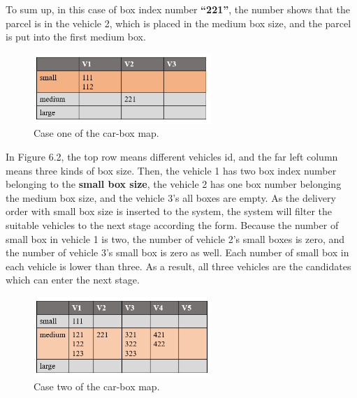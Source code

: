 \documentclass[12pt]{ksthesis}
\begin{document}
\begin{thesis}
{\begin{itemize}
\end{itemize}

To sum up, in this case of box index number \textbf{“221”}, the number shows that the parcel is in the vehicle 2, which is placed in the medium box size, and the parcel is put into the first medium box.

\begin{figure}[H]
\centering
\includegraphics[width=0.6\textwidth]{./Thesis_figures/F6-2_caseOne_boxFiltering.PNG}
\caption{\large Case one of the car-box map.}
\vspace{0.5cm}
\label{Fig:CaseOne_carBox_Map}
\end{figure}

In Figure 6.2, the top row means different vehicles id, and the far left column means three kinds of box size. Then, the vehicle 1 has two box index number belonging to the \textbf{small box size}, the vehicle 2 has one box number belonging the medium box size, and the vehicle 3’s all boxes are empty.
As the delivery order with small box size is inserted to the system, the system will filter the suitable vehicles to the next stage according the form. Because the number of small box in vehicle 1 is two, the number of vehicle 2’s small boxes is zero, and the number of vehicle 3’s small box is zero as well. Each number of small box in each vehicle is lower than three. As a result, all three vehicles are the candidates which can enter the next stage.

\begin{figure}[t]
\centering
\includegraphics[width=0.6\textwidth]{./Thesis_figures/F6-3_caseTwo_boxFiltering.PNG}
\caption{\large Case two of the car-box map.}
\vspace{0.5cm}
\label{Fig:CaseTwo_carBox_Map}
\end{figure}

}
\end{thesis}
\end{document}
